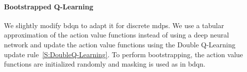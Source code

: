 \paragraph{Bootstrapped Q-Learning} We slightly modify \gls{bdqn} to adapt it for discrete \glspl{mdp}. We use a tabular approximation of the action value functions instead of using a deep neural network and update the action value functions using the Double Q-Learning update rule~\ref{S:DoubleQ-Learning}. To perform bootstrapping, the action value functions are initialized randomly and masking is used as in \gls{bdqn}.

\begin{figure}[t]
\begin{minipage}{.66\textwidth}
\begin{center}
\end{center}
\end{minipage}
\begin{minipage}{.33\textwidth}
\begin{center}

\end{center}
\end{minipage}
\end{figure}
